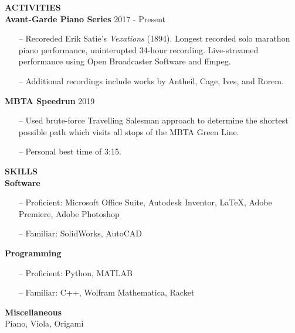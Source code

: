 \documentclass[10pt,a4paper]{article} %
\begin{document}
	\textbf{\LARGE{ACTIVITIES}}\\[6pt]
	\textbf{\Large{Avant-Garde Piano Series}} \hfill 2017 - Present
		\begin{enumerate}[noitemsep]
			\item[--] Recoreded Erik Satie's \textit{Vexations} (1894). Longest recorded solo marathon piano performance, uninterupted 34-hour recording. Live-streamed performance using Open Broadcaster Software and ffmpeg.
			\item[--] Additional recordings include works by Antheil, Cage, Ives, and Rorem.
		\end{enumerate}
	\textbf{\Large{MBTA Speedrun}} \hfill 2019
		\begin{enumerate}[noitemsep]
			\item[--] Used brute-force Travelling Salesman approach to determine the shortest possible path which visits all stops of the MBTA Green Line.
			\item[--] Personal best time of 3:15.
		\end{enumerate}
	\textbf{\LARGE{SKILLS}}\\[6pt]
		\textbf{\Large{Software}} 
			\begin{enumerate}[noitemsep]
				\item[--] Proficient: Microsoft Office Suite, Autodesk Inventor, \LaTeX , Adobe Premiere, Adobe Photoshop
				\item[--] Familiar: SolidWorks, AutoCAD
			\end{enumerate}
		\textbf{\Large{Programming}} 
			\begin{enumerate}[noitemsep]
				\item[--] Proficient: Python, MATLAB
				\item[--] Familiar: C++, Wolfram Mathematica, Racket
			\end{enumerate}
		\textbf{\Large{Miscellaneous}}\\
			Piano, Viola, Origami
		
\end{document}
